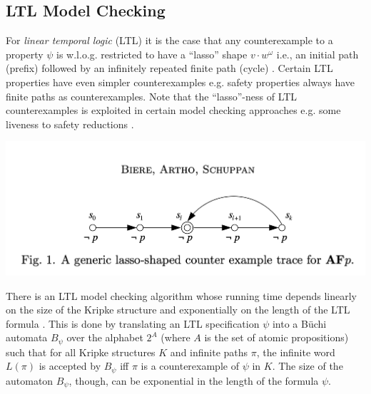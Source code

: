 \documentclass[10pt,a4paper]{article}
\begin{document}
\subsection*{LTL Model Checking}

For \textit{linear temporal logic} (LTL) it is the case that any counterexample to a property $\psi$ is w.l.o.g. restricted to have a ``lasso'' shape $v\cdot w^{\omega}$ i.e., an initial path (prefix) followed by an infinitely repeated finite path (cycle) \cite{1983wolpervardi}. Certain LTL properties have even simpler counterexamples e.g. safety properties always have finite paths as counterexamples. Note that the ``lasso''-ness of LTL counterexamples is exploited in certain model checking approaches e.g. some liveness to safety reductions \cite{BIERE2002160}.

\begin{center}
    \includegraphics[scale=0.3]{diagrams/ltl-lasso.png}
\end{center}

There is an LTL model checking algorithm whose running time depends linearly on the size of the Kripke structure and exponentially on the length of the LTL formula \cite{1985pnuelilich}. This is done by translating an LTL specification $\psi$ into a B{\"u}chi automata $B_{\psi}$ over the alphabet $2^A$ (where $A$ is the set of atomic propositions) such that for all Kripke structures $K$ and infinite paths $\pi$, the infinite word $L(\pi)$ is accepted by $B_{\psi}$ iff $\pi$ is a counterexample of $\psi$ in $K$. The size of the automaton $B_{\psi}$, though, can be exponential in the length of the formula $\psi$. 
\end{document}
